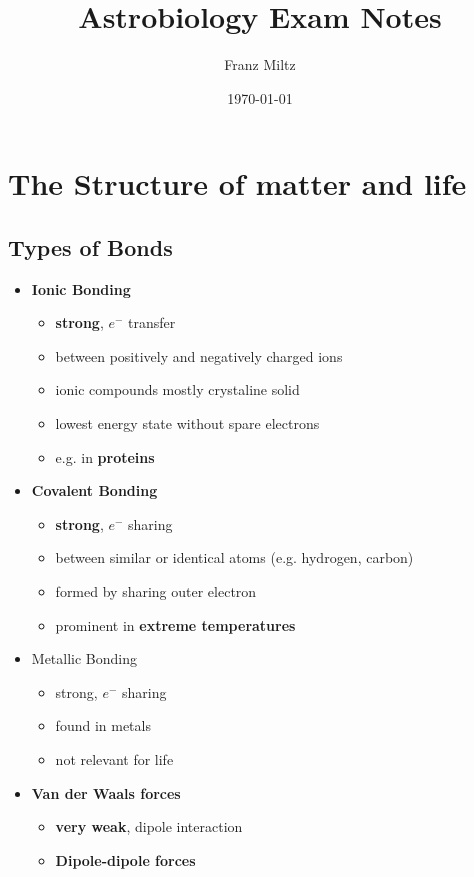 \documentclass{article}
\title{Astrobiology Exam Notes}
\date{\today}
\author{Franz Miltz}
\theoremstyle{sltheorem}
\begin{document}
\maketitle
\tableofcontents
\pagebreak
\section{The Structure of matter and life}
\subsection{Types of Bonds}
\begin{itemize}
    \item \textbf{Ionic Bonding}
    \begin{itemize}
        \item \textbf{strong}, $e^-$ transfer
        \item between positively and negatively charged ions
        \item ionic compounds mostly crystaline solid
        \item lowest energy state without spare electrons
        \item e.g. in \textbf{proteins}
    \end{itemize}
    \item \textbf{Covalent Bonding}
    \begin{itemize}
        \item \textbf{strong}, $e^-$ sharing
        \item between similar or identical atoms (e.g. hydrogen, carbon)
        \item formed by sharing outer electron
        \item prominent in \textbf{extreme temperatures}
    \end{itemize}
    \item Metallic Bonding
    \begin{itemize}
        \item strong, $e^-$ sharing
        \item found in metals
        \item not relevant for life
    \end{itemize}
    \item \textbf{Van der Waals forces}
    \begin{itemize}
        \item \textbf{very weak}, dipole interaction
        \item \textbf{Dipole-dipole forces}
        \begin{itemize}

\end{itemize}
\end{itemize}
\end{itemize}
\end{document}
